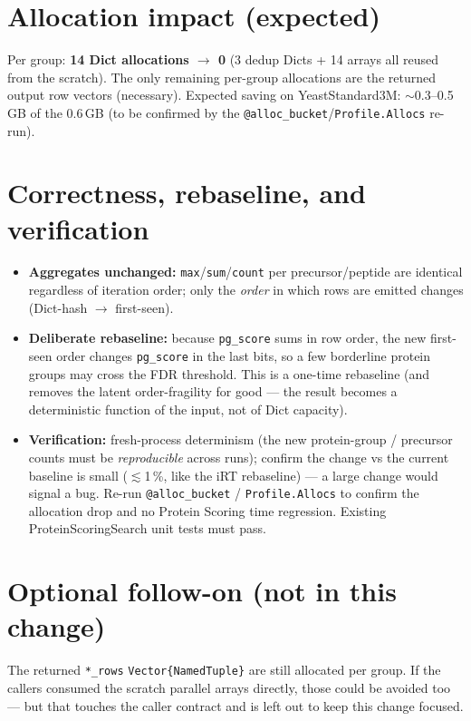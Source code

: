 \documentclass[11pt]{article}
\begin{document}
\section{Allocation impact (expected)}
Per group: \textbf{14 Dict allocations $\rightarrow$ 0} (3 dedup Dicts + 14 arrays
all reused from the scratch). The only remaining per-group allocations are the
returned output row vectors (necessary). Expected saving on YeastStandard3M:
$\sim$0.3--0.5\,GB of the 0.6\,GB (to be confirmed by the
\texttt{@alloc\_bucket}/\texttt{Profile.Allocs} re-run).

\section{Correctness, rebaseline, and verification}\label{sec:verify}
\begin{itemize}
  \item \textbf{Aggregates unchanged:} \texttt{max}/\texttt{sum}/\texttt{count} per
        precursor/peptide are identical regardless of iteration order; only the
        \emph{order} in which rows are emitted changes (Dict-hash $\rightarrow$
        first-seen).
  \item \textbf{Deliberate rebaseline:} because \texttt{pg\_score} sums in row order,
        the new first-seen order changes \texttt{pg\_score} in the last bits, so a
        few borderline protein groups may cross the FDR threshold. This is a one-time
        rebaseline (and removes the latent order-fragility for good --- the result
        becomes a deterministic function of the input, not of Dict capacity).
  \item \textbf{Verification:} fresh-process determinism (the new protein-group /
        precursor counts must be \emph{reproducible} across runs); confirm the change
        vs the current baseline is small ($\lesssim$1\,\%, like the iRT rebaseline)
        --- a large change would signal a bug. Re-run \texttt{@alloc\_bucket} /
        \texttt{Profile.Allocs} to confirm the allocation drop and no Protein Scoring
        time regression. Existing ProteinScoringSearch unit tests must pass.
\end{itemize}

\section{Optional follow-on (not in this change)}
The returned \texttt{*\_rows} \texttt{Vector\{NamedTuple\}} are still allocated per
group. If the callers consumed the scratch parallel arrays directly, those could be
avoided too --- but that touches the caller contract and is left out to keep this
change focused.
\end{document}
